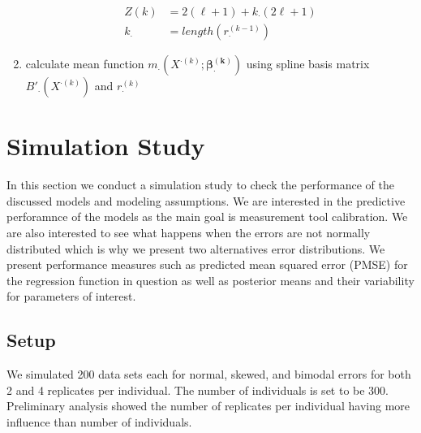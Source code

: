 \documentclass[11pt]{article}\usepackage[]{graphicx}\usepackage[]{color}
\begin{document}
\begin{enumerate}
\begin{align*}
Z(k) &= 2(\ell+1) + k_{\cdot}(2\ell+1) \\
k_{\cdot} &= length(r_{\cdot}^{(k-1)}) 
\end{align*}

\item
calculate mean function $m_{\cdot}(X^{\cdot(k)};\boldsymbol{\beta^{(k)}_{\cdot}})$ using spline basis matrix $B'_{\cdot}(X^{\cdot(k)})$ and $r_{\cdot}^{(k)}$


\end{enumerate}



\section{Simulation Study}

In this section we conduct a simulation study to check the performance of the discussed models and modeling assumptions. We are interested in the predictive perforamnce of the models as the main goal is measurement tool calibration. We are also interested to see what happens when the errors are not normally distributed which is why we present two alternatives error distributions. We present performance measures such as predicted mean squared error (PMSE) for the regression function in question as well as posterior means and their variability for parameters of interest. 


\subsection{Setup}

We simulated 200 data sets each for normal, skewed, and bimodal errors for both 2 and 4 replicates per individual. The number of individuals is set to be 300. Preliminary analysis showed the number of replicates per individual having  more influence than number of individuals. 
\end{document}
